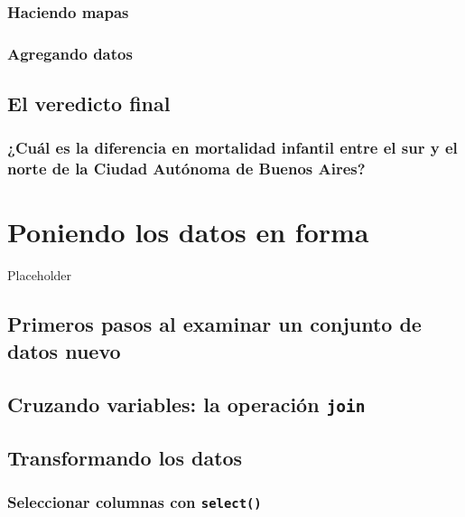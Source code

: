 \documentclass[]{book}
\begin{document}
\subsection{Haciendo mapas}\label{haciendo-mapas}

\subsection{Agregando datos}\label{agregando-datos}

\section{El veredicto final}\label{el-veredicto-final}

\subsection{¿Cuál es la diferencia en mortalidad infantil entre el sur y
el norte de la Ciudad Autónoma de Buenos
Aires?}\label{cual-es-la-diferencia-en-mortalidad-infantil-entre-el-sur-y-el-norte-de-la-ciudad-autonoma-de-buenos-aires}

\chapter{Poniendo los datos en forma}\label{poniendo-los-datos-en-forma}

Placeholder

\section{Primeros pasos al examinar un conjunto de datos
nuevo}\label{primeros-pasos-al-examinar-un-conjunto-de-datos-nuevo}

\section{\texorpdfstring{Cruzando variables: la operación
\texttt{join}}{Cruzando variables: la operación join}}\label{cruzando-variables-la-operacion-join}

\section{Transformando los datos}\label{transformando-los-datos}

\subsection{\texorpdfstring{Seleccionar columnas con
\texttt{select()}}{Seleccionar columnas con select()}}\label{seleccionar-columnas-con-select}
\end{document}
